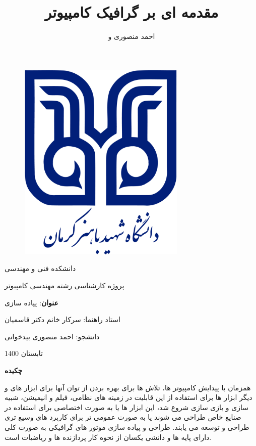 \documentclass[a4paper, 12pt]{book}
\title{ مقدمه ای بر گرافیک کامپیوتر}
\author{احمد منصوری و \lr{\textsf{\textbf{peter shirley}}}}
\date{\lr{December 21, 2009}}
\begin{document}
\let\cleardoublepage\clearpage

\begin{titlepage}
\begin{figure}[H]
    \centering
        \includegraphics[width=8cm]{images/logo.png}
\end{figure}

\vspace*{2cm}
    \begin{center}
      \large
      دانشکده فنی و مهندسی\par
      پروژه کارشناسی رشته مهندسی کامپیوتر\par
      \textbf{عنوان}:
      پیاده سازی \par
      استاد راهنما: سرکار خانم دکتر قاسمیان\par
      دانشجو: احمد منصوری بیدخوانی\par
      \normalsize
      تابستان 1400
    \end{center}

\end{titlepage}    
     

\huge\textbf{چکیده}
\normalsize
\begin{flushright}
  همزمان با پیدایش کامپیوتر ها، تلاش ها برای بهره بردن از توان آنها برای ابزار های  و دیگر ابزار ها برای
  استفاده از این قابلیت در زمینه های نظامی، فیلم و انیمیشن، شبیه سازی و بازی سازی شروع شد، این ابزار ها یا به صورت
  اختصاصی برای استفاده در صنایع خاص طراحی می شوند یا به صورت عمومی تر برای کاربرد های وسیع تری طراحی و توسعه می یابند.
   طراحی و پیاده سازی موتور های گرافیکی به صورت کلی دارای پایه ها و دانشی یکسان از نحوه کار پردازنده ها و ریاضیات است.

\end{flushright}
\end{document}

